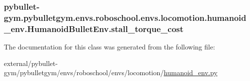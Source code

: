 \subsubsection[{\texorpdfstring{stall\+\_\+torque\+\_\+cost}{stall_torque_cost}}]{\setlength{\rightskip}{0pt plus 5cm}pybullet-\/gym.\+pybulletgym.\+envs.\+roboschool.\+envs.\+locomotion.\+humanoid\+\_\+env.\+Humanoid\+Bullet\+Env.\+stall\+\_\+torque\+\_\+cost}\hypertarget{classpybullet-gym_1_1pybulletgym_1_1envs_1_1roboschool_1_1envs_1_1locomotion_1_1humanoid__env_1_1_humanoid_bullet_env_ae2a893906c1af08a57ca5aa7a5fa9313}{}\label{classpybullet-gym_1_1pybulletgym_1_1envs_1_1roboschool_1_1envs_1_1locomotion_1_1humanoid__env_1_1_humanoid_bullet_env_ae2a893906c1af08a57ca5aa7a5fa9313}


The documentation for this class was generated from the following file\+:\begin{DoxyCompactItemize}
\item 
external/pybullet-\/gym/pybulletgym/envs/roboschool/envs/locomotion/\hyperlink{roboschool_2envs_2locomotion_2humanoid__env_8py}{humanoid\+\_\+env.\+py}\end{DoxyCompactItemize}
